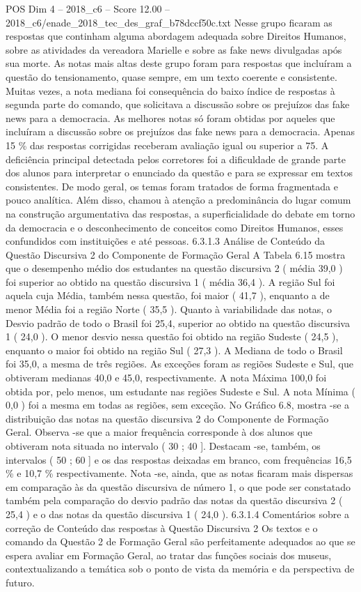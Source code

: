 \begin{textsample}{POS Dim 4 – 2018\_c6 – Score 12.00 – 2018\_c6/enade\_2018\_tec\_des\_graf\_b78dccf50c.txt}
Nesse grupo ficaram as respostas que continham alguma abordagem adequada sobre Direitos Humanos, sobre as atividades da vereadora Marielle e sobre as fake news divulgadas após sua morte.
As notas mais altas deste grupo foram para respostas que incluíram a questão do tensionamento, quase sempre, em um texto coerente e consistente.
Muitas vezes, a nota mediana foi consequência do baixo índice de respostas à segunda parte do comando, que solicitava a discussão sobre os prejuízos das fake news para a democracia.
As melhores notas só foram obtidas por aqueles que incluíram a discussão sobre os prejuízos das fake news para a democracia.
Apenas 15 \% das respostas corrigidas receberam avaliação igual ou superior a 75.
A deficiência principal detectada pelos corretores foi a dificuldade de grande parte dos alunos para interpretar o enunciado da questão e para se expressar em textos consistentes.
De modo geral, os temas foram tratados de forma fragmentada e pouco analítica.
Além disso, chamou à atenção a predominância do lugar comum na construção argumentativa das respostas, a superficialidade do debate em torno da democracia e o desconhecimento de conceitos como Direitos Humanos, esses confundidos com instituições e até pessoas. 6.3.1.3 Análise de Conteúdo da Questão Discursiva 2 do Componente de Formação Geral A Tabela 6.15 mostra que o desempenho médio dos estudantes na questão discursiva 2 ( média 39,0 ) foi superior ao obtido na questão discursiva 1 ( média 36,4 ).
A região Sul foi aquela cuja Média, também nessa questão, foi maior ( 41,7 ), enquanto a de menor Média foi a região Norte ( 35,5 ).
Quanto à variabilidade das notas, o Desvio padrão de todo o Brasil foi 25,4, superior ao obtido na questão discursiva 1 ( 24,0 ).
O menor desvio nessa questão foi obtido na região Sudeste ( 24,5 ), enquanto o maior foi obtido na região Sul ( 27,3 ).
A Mediana de todo o Brasil foi 35,0, a mesma de três regiões.
As exceções foram as regiões Sudeste e Sul, que obtiveram medianas 40,0 e 45,0, respectivamente.
A nota Máxima 100,0 foi obtida por, pelo menos, um estudante nas regiões Sudeste e Sul.
A nota Mínima ( 0,0 ) foi a mesma em todas as regiões, sem exceção.
No Gráfico 6.8, mostra -se a distribuição das notas na questão discursiva 2 do Componente de Formação Geral.
Observa -se que a maior frequência corresponde à dos alunos que obtiveram nota situada no intervalo ( 30 ; 40 ].
Destacam -se, também, os intervalos ( 50 ; 60 ] e os das respostas deixadas em branco, com frequências 16,5 \% e 10,7 \% respectivamente.
Nota -se, ainda, que as notas ficaram mais dispersas em comparação às da questão discursiva de número 1, o que pode ser constatado também pela comparação do desvio padrão das notas da questão discursiva 2 ( 25,4 ) e o das notas da questão discursiva 1 ( 24,0 ). 6.3.1.4 Comentários sobre a correção de Conteúdo das respostas à Questão Discursiva 2 Os textos e o comando da Questão 2 de Formação Geral são perfeitamente adequados ao que se espera avaliar em Formação Geral, ao tratar das funções sociais dos museus, contextualizando a temática sob o ponto de vista da memória e da perspectiva de futuro.

\end{textsample}
